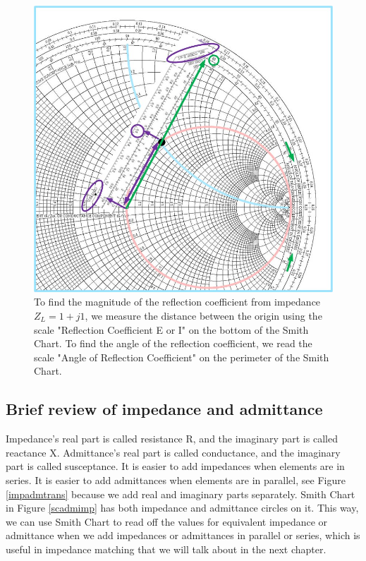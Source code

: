 \documentclass{ximera}
\begin{document}
\begin{figure}[htbp]
\begin{center}
\includegraphics[scale=0.3]{../jpg/FindingGammaFromImpedanceonSC.jpg}
\end{center}
\caption{To find the magnitude of the reflection coefficient from impedance $Z_L=1+j 1$, we measure the distance between the origin using the scale "Reflection Coefficient E or I" on the bottom of the Smith Chart. To find the angle of the reflection coefficient, we read the scale "Angle of Reflection Coefficient" on the perimeter of the Smith Chart.}
\label{scgammafromZ}
\end{figure}

\newpage

\subsection*{Brief review of impedance and admittance}

Impedance's real part is called resistance R, and the imaginary part is called reactance X. Admittance's real part is called conductance, and the imaginary part is called susceptance. It is easier to add impedances when elements are in series. It is easier to add admittances when elements are in parallel, see Figure \ref{impadmtrans} because we add real and imaginary parts separately.  Smith Chart in Figure \ref{scadmimp} has both impedance and admittance circles on it.  This way, we can use Smith Chart to read off the values for equivalent impedance or admittance when we add impedances or admittances in parallel or series, which is useful in impedance matching that we will talk about in the next chapter. 
\end{document}

